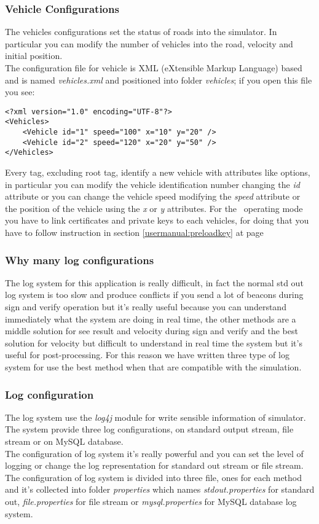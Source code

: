 \subsubsection{Vehicle Configurations}\label{usermanual:vehicleconfigurations}
The vehicles configurations set the status of roads into the simulator. In particular you can modify the number of vehicles into the road, velocity and initial position.\\
The configuration file for vehicle is XML (eXtensible Markup Language) based and is named \textit{vehicles.xml} and positioned into folder \textit{vehicles}; if you open this file you see:
\begin{verbatim}
<?xml version="1.0" encoding="UTF-8"?>
<Vehicles>
    <Vehicle id="1" speed="100" x="10" y="20" />
    <Vehicle id="2" speed="120" x="20" y="50" />
</Vehicles>
\end{verbatim}
Every tag, excluding root tag, identify a new vehicle with attributes like options, in particular you can modify the vehicle identification number changing the \textit{id} attribute or you can change the vehicle speed modifying the \textit{speed} attribute or the position of the vehicle using the \textit{x} or \textit{y} attributes.
For the \baseline~operating mode you have to link certificates and private keys to each vehicles, for doing that you have to follow instruction in section \ref{usermanual:preloadkey} at page \pageref{usermanual:preloadkey}
\subsubsection{Why many log configurations}
The log system for this application is really difficult, in fact the normal std out log system is too slow and produce conflicts if you send a lot of beacons during sign and verify operation but it's really useful because you can understand immediately what the system are doing in real time, the other methods are a middle solution for see result and velocity during sign and verify and the best solution for velocity but difficult to understand in real time the system but it's useful for post-processing. For this reason we have written three type of log system for use the best method when that are compatible with the simulation.
\subsubsection{Log configuration}\label{usermanual:logconfiguration}
The log system use the \textit{log4j} module for write sensible information of simulator. The system provide three log configurations, on standard output stream, file stream or on MySQL database.\\
The configuration of log system it's really powerful and you can set the level of logging or change the log representation for standard out stream or file stream. The configuration of log system is divided into three file, ones for each method and it's collected into folder \textit{properties} which names \textit{stdout.properties} for standard out, \textit{file.properties} for file stream or \textit{mysql.properties} for MySQL database log system.
